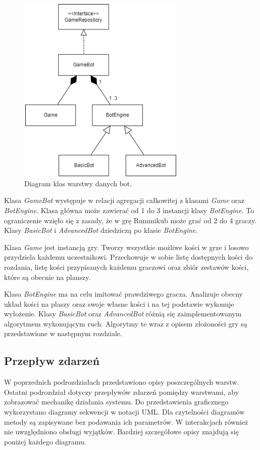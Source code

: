 \begin{figure}[h!]
	\begin{center}
		\includegraphics[width=8cm,height=9cm]{img/bot-client.png}
	\end{center}
	\caption{{\color{dgray}Diagram klas warstwy danych bot.}} 
	\label{bot}
\end{figure}

Klasa \emph{GameBot} występuje w relacji agregacji całkowitej z klasami \emph{Game} oraz \emph{BotEngine}. Klasa główna może zawierać od 1 do 3 instancji klasy \emph{BotEngine}. To ograniczenie wzięło się z zasady, że w grę Rummikub może grać od 2 do 4 graczy. Klasy \emph{BasicBot} i \emph{AdvancedBot} dziedziczą po klasie \emph{BotEngine}. 

Klasa \emph{Game} jest instancją gry. Tworzy wszystkie możliwe kości w grze i losowo przydziela każdemu uczestnikowi. Przechowuje w sobie listę dostępnych kości do rozdania, listę kości przypisanych każdemu graczowi oraz zbiór zestawów kości, które są obecnie na planszy. 

Klasa \emph{BotEngine} ma na celu imitować prawdziwego gracza. Analizuje obecny układ kości na plaszy oraz swoje własne kości i na tej podstawie wykonuje wyłożenie. Klasy \emph{BasicBot} oraz \emph{AdvancedBot} różnią się zaimplementowanym algorytmem wykonującym ruch. Algorytmy te wraz z opisem złożoności gry są przedstawione w następnym rozdziale.

\subsection{Przepływ zdarzeń}

W poprzednich podrozdziałach przedstawiono opisy poszczególnych warstw. Ostatni podrozdział dotyczy przepływów zdarzeń pomiędzy warstwami, aby zobrazować mechanikę działania systemu. Do przedstawienia graficznego wykorzystano diagramy sekwencji w notacji UML. Dla czytelności diagramów metody są zapisywane bez podawania ich parametrów. W interakcjach również nie uwzględniono obsługi wyjątków. Bardziej szczegółowe opisy znajdują się poniżej każdego diagramu.

